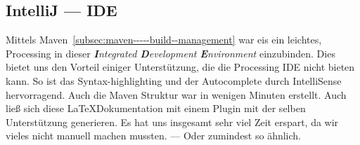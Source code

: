 \subsection{IntelliJ --- IDE}\label{subsec:intellij-----ide}
    Mittels Maven~\ref{subsec:maven-----build--management} war eis ein leichtes, Processing in dieser \textit{\textbf{I}ntegrated \textbf{D}evelopment \textbf{E}nvironment} einzubinden.
    Dies bietet uns den Vorteil einiger Unterstützung, die die Processing IDE nicht bieten kann.
    So ist das Syntax-highlighting und der Autocomplete durch IntelliSense hervorragend.
    Auch die Maven Struktur war in wenigen Minuten erstellt.
    Auch ließ sich diese \LaTeX Dokumentation mit einem Plugin mit der selben Unterstützung generieren.
    Es hat uns insgesamt sehr viel Zeit erspart, da wir vieles nicht manuell machen mussten.
     --- Oder zumindest so ähnlich.